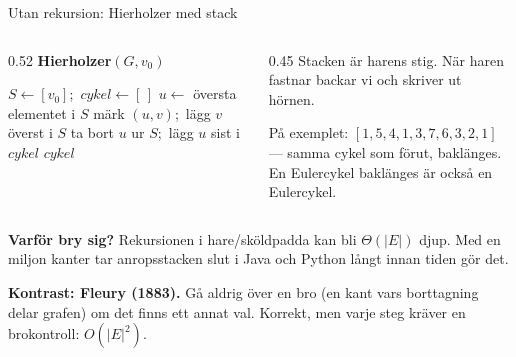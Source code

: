 {\kaninbg
\begin{frame}{\kh Utan rekursion: Hierholzer med stack}
\begin{columns}[T]
\begin{column}{0.52\textwidth}
{\small\bfseries\color{kthnavy}Hierholzer$(G,v_0)$}
\footnotesize
\begin{algorithmic}[1]
\State $S\gets[v_0]$;\ $\mathit{cykel}\gets[\,]$
  \State $u\gets$ översta elementet i $S$
   
    \State märk $(u,v)$;\ lägg $v$ överst i $S$
  \Else
    \State ta bort $u$ ur $S$;\ lägg $u$ sist i $\mathit{cykel}$
  \EndIf
\EndWhile
\State \Return $\mathit{cykel}$
\end{algorithmic}
\end{column}
\begin{column}{0.45\textwidth}
\small
Stacken är harens stig. När haren fastnar backar vi och skriver ut hörnen.\par\medskip
På exemplet: $[1,5,4,1,3,7,6,3,2,1]$ — samma cykel som förut, baklänges. En Eulercykel
baklänges är också en Eulercykel.
\end{column}
\end{columns}
\vfill
\begin{kaninbox}[fontupper=\footnotesize]
\textbf{Varför bry sig?} Rekursionen i hare/sköldpadda kan bli $\Theta(|E|)$ djup. Med en
miljon kanter tar anropsstacken slut i Java och Python långt innan tiden gör det.
\end{kaninbox}
\begin{kaninbox}[fontupper=\footnotesize]
\textbf{Kontrast: Fleury (1883).} Gå aldrig över en bro (en kant vars borttagning delar grafen)
om det finns ett annat val. Korrekt, men varje steg kräver en brokontroll: $O(|E|^2)$.
\end{kaninbox}
\end{frame}}

